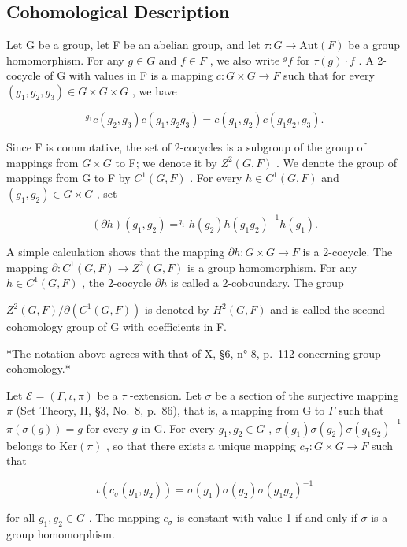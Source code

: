 \subsection{Cohomological Description}

Let G be a group, let F be an abelian group, and let \(\tau: G \to \text{Aut}(F)\) be a group homomorphism. For any \(g \in G\) and \(f \in F\) , we also write \(^{g}f\) for \(\tau(g) \cdot f\) . A 2-cocycle of G with values in F is a mapping \(c: G \times G \to F\) such that for every \((g_{1}, g_{2}, g_{3}) \in G \times G \times G\) , we have

\[
{ } ^ { g _ { 1 } } c ( g _ { 2 } , g _ { 3 } ) c ( g _ { 1 } , g _ { 2 } g _ { 3 } ) = c ( g _ { 1 } , g _ { 2 } ) c ( g _ { 1 } g _ { 2 } , g _ { 3 } ) .\tag{7}
\]

Since F is commutative, the set of 2-cocycles is a subgroup of the group of mappings from \(G \times G\) to F; we denote it by \(Z^{2}(G,F)\) . We denote the group of mappings from G to F by \(C^{1}(G,F)\) . For every \(h \in C^{1}(G,F)\) and \((g_{1}, g_{2}) \in G \times G\) , set

\[
(\partial h) (g _ {1}, g _ {2}) = ^ {g _ {1}} h (g _ {2}) h (g _ {1} g _ {2}) ^ {- 1} h (g _ {1}).\tag{8}
\]

A simple calculation shows that the mapping \(\partial h: G \times G \to F\) is a 2-cocycle. The mapping \(\partial: C^{1}(G, F) \to Z^{2}(G, F)\) is a group homomorphism. For any \(h \in C^{1}(G, F)\) , the 2-cocycle \(\partial h\) is called a 2-coboundary. The group

\(Z^{2}(G,F)/\partial(C^{1}(G,F))\) is denoted by \(H^{2}(G,F)\) and is called the second cohomology group of G with coefficients in F.

*The notation above agrees with that of X, §6, n° 8, p.~112 concerning group cohomology.*

Let \(\mathcal{E} = (\Gamma, \iota, \pi)\) be a \(\tau\) -extension. Let \(\sigma\) be a section of the surjective mapping \(\pi\) (Set Theory, II, §3, No.~8, p.~86), that is, a mapping from G to \(\Gamma\) such that \(\pi(\sigma(g)) = g\) for every \(g\) in G. For every \(g_1, g_2 \in G\) , \(\sigma(g_1)\sigma(g_2)\sigma(g_1g_2)^{-1}\) belongs to \(\mathrm{Ker}(\pi)\) , so that there exists a unique mapping \(c_\sigma: G \times G \to F\) such that

\[
\iota (c _ {\sigma} (g _ {1}, g _ {2})) = \sigma (g _ {1}) \sigma (g _ {2}) \sigma (g _ {1} g _ {2}) ^ {- 1}\tag{9}
\]

for all \(g_{1}, g_{2} \in G\) . The mapping \(c_{\sigma}\) is constant with value 1 if and only if \(\sigma\) is a group homomorphism.

